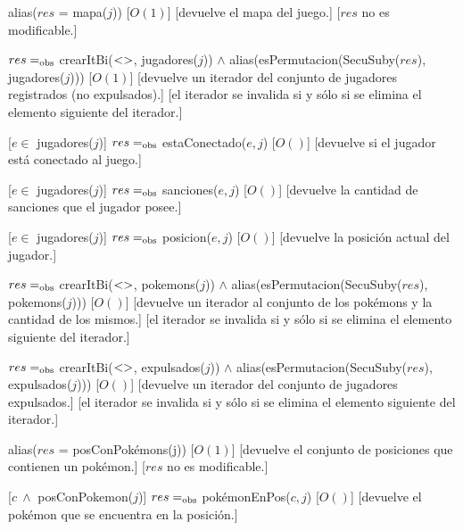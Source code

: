 \begin{Interfaz}
	{alias($res$ = mapa($j$))}
	[$O(1)$]
	[devuelve el mapa del juego.]
	[$res$ no es modificable.]

	{$res =_{\mathrm{obs}}$ crearItBi($<>$, jugadores($j$)) $\land$ alias(esPermutacion(SecuSuby($res$), jugadores($j$)))}
	[$O(1)$]
	[devuelve un iterador del conjunto de jugadores registrados (no expulsados).]
	[el iterador se invalida si y sólo si se elimina el elemento siguiente del iterador.]

	[$e \in$ jugadores($j$)]
	{$res =_{\mathrm{obs}}$ estaConectado($e, j$)}
	[$O()$]
	[devuelve si el jugador está conectado al juego.]

	[$e \in$ jugadores($j$)]
	{$res =_{\mathrm{obs}}$ sanciones($e, j$)}
	[$O()$]
	[devuelve la cantidad de sanciones que el jugador posee.]

	[$e \in$ jugadores($j$)]
	{$res =_{\mathrm{obs}}$ posicion($e, j$)}
	[$O()$]
	[devuelve la posición actual del jugador.]

	{$res =_{\mathrm{obs}}$ crearItBi($<>$, pokemons($j$)) $\land$ alias(esPermutacion(SecuSuby($res$), pokemons($j$)))}
	[$O()$]
	[devuelve un iterador al conjunto de los pokémons y la cantidad de los mismos.]
	[el iterador se invalida si y sólo si se elimina el elemento siguiente del iterador.]

	{$res =_{\mathrm{obs}}$ crearItBi($<>$, expulsados($j$)) $\land$ alias(esPermutacion(SecuSuby($res$), expulsados($j$)))}
	[$O()$]
	[devuelve un iterador del conjunto de jugadores expulsados.]
	[el iterador se invalida si y sólo si se elimina el elemento siguiente del iterador.]

	{alias($res$ = posConPokémons(j))}
	[$O(1)$]
	[devuelve el conjunto de posiciones que contienen un pokémon.]
	[$res$ no es modificable.]

	[$c \ \land$ posConPokemon($j$)]
	{$res =_{\mathrm{obs}}$ pokémonEnPos($c,j$)}
	[$O()$]
	[devuelve el pokémon que se encuentra en la posición.]


\end{Interfaz}
